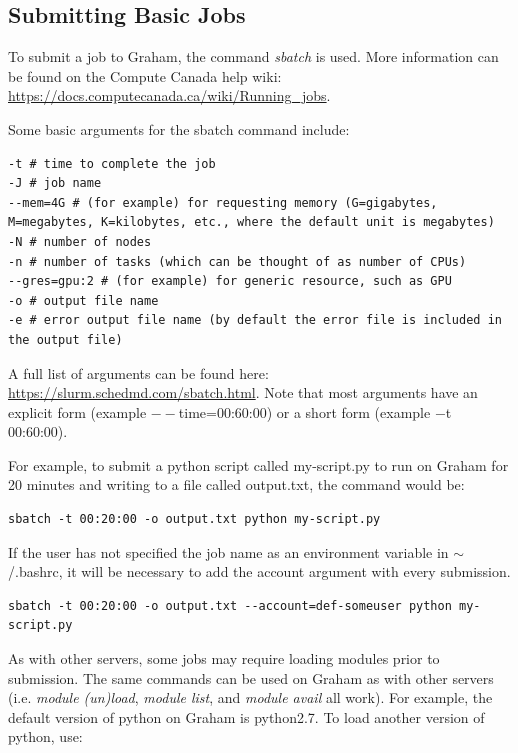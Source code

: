 \documentclass[12pt]{article}
\begin{document}
\subsection{Submitting Basic Jobs}
\quad\enskip\quad To submit a job to Graham, the command \textit{sbatch} is used. More information can be found on the Compute Canada help wiki: \url{https://docs.computecanada.ca/wiki/Running_jobs}.

\quad Some basic arguments for the sbatch command include:
\begin{lstlisting}[numbers=none, basicstyle=\normalsize]
-t # time to complete the job
-J # job name
--mem=4G # (for example) for requesting memory (G=gigabytes, M=megabytes, K=kilobytes, etc., where the default unit is megabytes) 
-N # number of nodes
-n # number of tasks (which can be thought of as number of CPUs) 
--gres=gpu:2 # (for example) for generic resource, such as GPU
-o # output file name
-e # error output file name (by default the error file is included in the output file)
\end{lstlisting}
 A full list of arguments can be found here: \url{https://slurm.schedmd.com/sbatch.html}. Note that most arguments have an explicit form (example $--$time=00:60:00) or a short form (example $-$t 00:60:00). 
 
\quad For example, to submit a python script called my-script.py to run on Graham for 20 minutes and writing to a file called output.txt, the command would be: 
\begin{lstlisting}[numbers=none, basicstyle=\normalsize]
sbatch -t 00:20:00 -o output.txt python my-script.py
\end{lstlisting}

\quad If the user has not specified the job name as an environment variable in $\sim$/.bashrc, it will be necessary to add the account argument with every submission.

\begin{lstlisting}[numbers=none, basicstyle=\normalsize]
sbatch -t 00:20:00 -o output.txt --account=def-someuser python my-script.py
\end{lstlisting}

\quad As with other servers, some jobs may require loading modules prior to submission. The same commands can be used on Graham as with other servers (i.e. \textit{module (un)load}, \textit{module list}, and \textit{module avail} all work). For example, the default version of python on Graham is python2.7. To load another version of python, use:
\end{document}
